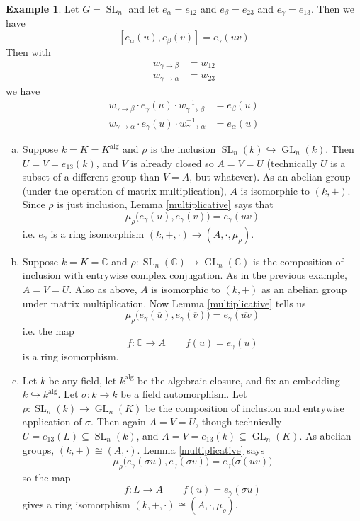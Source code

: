 \documentclass[12pt]{article}
\theoremstyle{definition}
\newtheorem{example}{Example}
\newcommand{\C}{\mathbb{C}}
\newcommand{\sig}{\sigma}
\newcommand{\inv}{^{-1}}
\newcommand{\ov}{\overline}
\newcommand{\into}{\hookrightarrow}
\newcommand{\iso}{\cong}
\DeclareMathOperator{\SL}{SL}
\DeclareMathOperator{\GL}{GL}
\DeclareMathOperator{\alg}{alg}
\begin{document}
\begin{example}
Let $G = \SL_n$ and let $e_\alpha = e_{12}$ and $e_\beta = e_{23}$ and $e_\gamma = e_{13}$. Then we have
\[
	[e_\alpha(u), e_\beta(v)] = e_\gamma(uv)
\]
Then with 
\begin{align*}
	w_{\gamma \to \beta} &= w_{12} \\
	w_{\gamma \to \alpha} &= w_{23}
\end{align*}
we have
\begin{align*}
	w_{\gamma \to \beta} \cdot e_\gamma(u) \cdot w_{\gamma \to \beta} \inv &= e_\beta(u) \\
	w_{\gamma \to \alpha} \cdot e_\gamma(u) \cdot w_{\gamma \to \alpha} \inv &= e_\alpha(u)
\end{align*}
\begin{enumerate}[(a)]
\item Suppose $k=K = K^{\alg}$ and $\rho$ is the inclusion $\SL_n(k) \into \GL_n(k)$. Then $U = V = e_{13}(k)$, and $V$ is already closed so $A = V = U$ (technically $U$ is a subset of a different group than $V = A$, but whatever). As an abelian group (under the operation of matrix multiplication), $A$ is isomorphic to $(k, +)$. Since $\rho$ is just inclusion, Lemma \ref{multiplicative} says that
\[
	\mu_\rho \Big( e_\gamma(u), e_\gamma(v) \Big) = e_\gamma(uv)
\]
i.e. $e_\gamma$ is a ring isomorphism $(k, +, \cdot) \to (A, \cdot, \mu_\rho)$.

\item Suppose $k = K = \C$ and $\rho:\SL_n(\C) \to \GL_n(\C)$ is the composition of inclusion with entrywise complex conjugation. As in the previous example, $A = V = U$. Also as above, $A$ is isomorphic to $(k,+)$ as an abelian group under matrix multiplication. Now Lemma \ref{multiplicative} tells us
\[
	\mu_\rho \Big(  e_\gamma( \ov u), e_\gamma( \ov v) \Big) = e_\gamma(\ov{uv})
\]
i.e. the map
\[
	f:\C \to A \qquad f(u) = e_\gamma( \ov u)
\]
is a ring isomorphism.

\item Let $k$ be any field, let $k^{\alg}$ be the algebraic closure, and fix an embedding $k \into k^{\alg}.$ Let $\sig:k \to k$ be a field automorphism. Let $\rho:\SL_n(k) \to \GL_n(K)$ be the composition of inclusion and entrywise application of $\sig$. Then again $A = V = U$, though technically $U = e_{13}(L) \subseteq \SL_n(k)$, and $A = V = e_{13}(k) \subseteq \GL_n(K)$. As abelian groups, $(k, +) \iso (A, \cdot)$. Lemma \ref{multiplicative} says
\[
	\mu_\rho \Big( e_\gamma( \sig u), e_\gamma ( \sig v) \Big) = e_\gamma \Big( \sig(uv) \Big)
\]
so the map
\[
	f:L \to A \qquad f(u) = e_\gamma( \sig u)
\]
gives a ring isomorphism $(k, +, \cdot) \iso (A, \cdot, \mu_\rho)$.


\end{enumerate}
\end{example}
\end{document}
